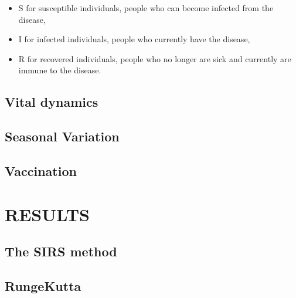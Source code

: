 \documentclass[a4paper]{article}
\let\Oldsection\section
\renewcommand{\section}{\FloatBarrier\Oldsection}
\let\Oldsubsection\subsection
\renewcommand{\subsection}{\FloatBarrier\Oldsubsection}
\begin{document}
\begin{itemize}
	\item S for susceptible individuals, people who can become infected from the disease,
	\item I for infected individuals, people who currently have the disease,
	\item R for recovered individuals, people who no longer are sick and currently are immune to the disease.
\end{itemize}


\subsection{Vital dynamics}


\subsection{Seasonal Variation}


\subsection{Vaccination}



\section{RESULTS}

\subsection{The SIRS method}

\subsection{RungeKutta}
\end{document}
